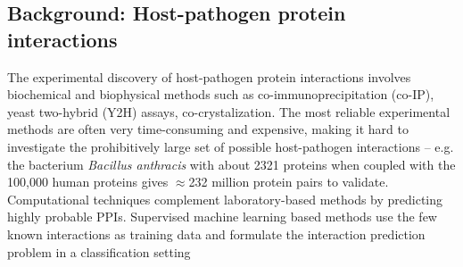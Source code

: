 \documentclass[runningheads,a4paper]{llncs}
\begin{document}
\subsection{Background: Host-pathogen protein interactions}
The experimental discovery of host-pathogen protein interactions involves biochemical and biophysical methods such as co-immunoprecipitation (co-IP), yeast two-hybrid (Y2H) assays, co-crystalization. %
The most reliable experimental methods are often very time-consuming and expensive, making it hard to investigate the prohibitively large set of possible host-pathogen interactions -- e.g. the bacterium \textit{Bacillus anthracis} with about 2321 proteins when coupled with the 100,000 human proteins gives $\approx$232 million protein pairs to validate. Computational techniques complement laboratory-based methods by predicting highly probable PPIs. Supervised machine learning based methods use the few known interactions as training data and formulate the interaction prediction problem in a classification setting%
\end{document}
